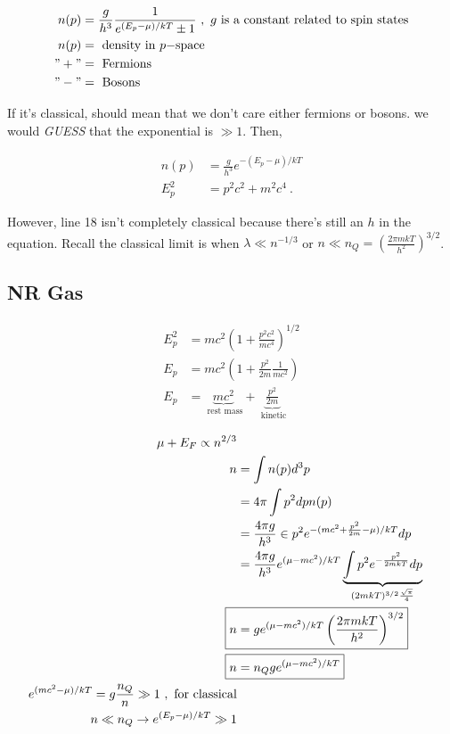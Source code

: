 \documentclass[10pt,letterpaper,final]{book}
\newcommand{\pt}{\propto}
\newcommand{\rp}{\right)}
\newcommand{\lp}{\left(}
\newcommand{\ra}{\rightarrow}
\begin{document}
\begin{align}
n(p) &= \frac{g}{h^3} \frac{1}{e^{(E_p - \mu)/kT} \pm 1}~,\text{ $g$ is a constant related to spin states}\\
n(p) &= \text{ density in $p-$space}\\
"+" &= \text{ Fermions}\\
"-" &= \text{ Bosons}
\end{align}

If it's classical, should mean that we don't care either fermions or bosons. we would \textit{GUESS} that the exponential is $\gg 1$. Then,

\begin{align}
n(p) &= \frac{g}{h^3}e ^{-(E_p - \mu)/kT}\\
E_p^2 &= p^2c^2 +  m^2c^4~.
\end{align}

However, line 18 isn't completely classical because there's still an $h$ in the equation. Recall the classical limit is when $\lambda \ll n^{-1/3}$ or $n \ll n_Q = \lp \frac{2 \pi m kT}{h^2} \rp^{3/2}$.

\subsection{NR Gas}

\begin{align}
E_p^2 &= mc^2\lp 1 + \frac{p^2c^2}{mc^4} \rp^{1/2}\\
E_p &= mc^2 \lp 1 + \frac{p^2}{2m} \frac{1}{mc^2} \rp\\
E_p &= \underbrace{mc^2}_{\text{ rest mass}} + \underbrace{\frac{p^2}{2m}}_{\text{ kinetic}}
\end{align}

\begin{align}
\mu + E_F \pt n^{2/3}\\
n &= \int n(p) d^3p\\
&= 4 \pi \int p^2 dp n(p)\\
&= \frac{4 \pi g}{h^3}  \in p^2 e^{-(mc^2 + \frac{p^2}{2m} - \mu)/kT} dp\\
&= \frac{4 \pi g}{h^3} e^{(\mu -mc^2)/kT} \underbrace{\int  p^2 e^{-\frac{p^2}{2mkT}} dp}_{(2mkT)^{3/2} \frac{\sqrt{\pi}}{4}}\\
\Aboxed{n &= g e^{(\mu - mc^2)/kT} \lp \frac{2 \pi mkT}{h^2} \rp^{3/2}}\\
\Aboxed{n &= n_Q g e^{(\mu - mc^2)/kT}}\\
e^{(mc^2 - \mu)/kT} = g\frac{n_Q}{n} \gg 1 ~, \text{ for classical}\\
n \ll n_Q \ra e^{(E_p - \mu)/kT} \gg 1
\end{align}
\end{document}
